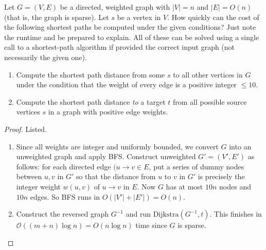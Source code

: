 \documentclass{article}
\begin{document}
    \begin{exercise}
      Let  $G=(V, E)$ be a directed, weighted graph with $|V|= n$ and $|E|=O(n)$ (that is, the graph is sparse). Let $s$ be a vertex in $V$. How quickly can the cost of the following shortest paths be computed under the given conditions? Just note the runtime and be prepared to explain. All of these can be solved using a single call to a shortest-path algorithm if provided the correct input graph (not necessarily the given one).
      \begin{enumerate}
        \item Compute the shortest path distance from some $s$ to all other vertices in $G$ under the condition that the weight of every edge is a positive integer $\le  10$.
        \item Compute the shortest path distance \textit{to} a target $t$ from all possible source vertices $s$ in a graph with positive edge weights.
      \end{enumerate}
    \end{exercise}
    \begin{proof}
      Listed. 
      \begin{enumerate}
        \item Since all weights are integer and uniformly bounded, we convert $G$ into an unweighted graph and apply BFS. Construct unweighted $G'=(V', E')$ as follows: for each directed edge $(u\to v \in E$, put a series of dummy nodes between $u,v$ in $G'$ so that the distance from $u$ to $v$ in $G'$ is precisely the integer weight $w(u,v)$ of $u\to v$ in $E$. Now $G$ has at most $10n$ nodes and $10n$ edges. So BFS runs in $O(\lvert V'\rvert  + \lvert E'\rvert ) = O(n)$.
        \item Construct the reversed graph $G^{-1}$ and run $\mathrm{Dijkstra}(G^{-1}, t)$. This finishes in $\mathcal{O}((m+n) \log n) = O(n\log n)$ time since $G$ is sparse.
      \end{enumerate}
    \end{proof}
\end{document}
